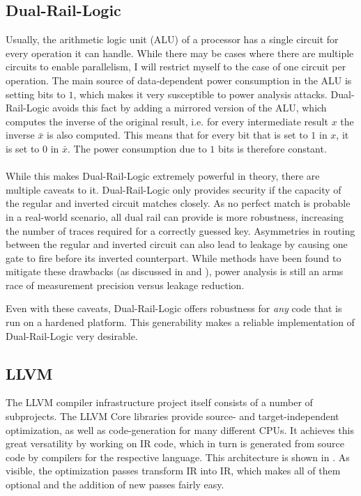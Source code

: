 \documentclass{article}
\newcommand{\dual}{Dual-Rail-Logic}
\newcommand{\llvm}{LLVM}
\newcommand{\lc}{\llvm{} Core}
\begin{document}
\subsection{\dual{}}
Usually, the arithmetic logic unit (ALU) of a processor has a single circuit for every operation it can handle.
While there may be cases where there are multiple circuits to enable parallelism, I will restrict myself to the case of one circuit per operation.
The main source of data-dependent power consumption in the ALU is setting bits to $1$, which makes it very susceptible to power analysis attacks.
\dual{} avoids this fact by adding a mirrored version of the ALU, which computes the inverse of the original result, i.e. for every intermediate result $x$ the inverse $\bar{x}$ is also computed.
This means that for every bit that is set to $1$ in $x$, it is set to $0$ in $\bar{x}$.
The power consumption due to $1$ bits is therefore constant.
\\
\\
While this makes \dual{} extremely powerful in theory, there are multiple caveats to it.
\dual{} only provides security if the capacity of the regular and inverted circuit matches closely\cite{tiri2005prototype}.
As no perfect match is probable in a real-world scenario, all dual rail can provide is more robustness, increasing the number of traces required for a correctly guessed key.
Asymmetries in routing between the regular and inverted circuit can also lead to leakage by causing one gate to fire before its inverted counterpart\cite{soares2008evaluating}.
While methods have been found to mitigate these drawbacks (as discussed in \cite{tiri2005prototype} and \cite{soares2008evaluating}), power analysis is still an arms race of measurement precision versus leakage reduction.

Even with these caveats, \dual{} offers robustness for \emph{any} code that is run on a hardened platform.
This generability makes a reliable implementation of \dual{} very desirable.

\subsection{\llvm{}}
The \llvm{} compiler infrastructure project\cite{lattner2004llvm} itself consists of a number of subprojects.
The \lc{} libraries provide source- and target-independent optimization, as well as code-generation for many different CPUs.\cite{lattner2010llvm}
It achieves this great versatility by working on IR code, which in turn is generated from source code by compilers for the respective language.
This architecture is shown in .
As visible, the optimization passes transform IR into IR, which makes all of them optional and the addition of new passes fairly easy.
\end{document}
